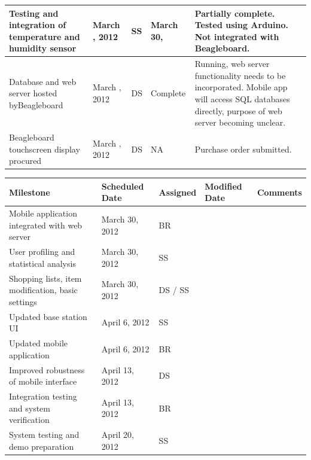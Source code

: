 \documentclass[11pt,letterpaper]{article}
\begin{document}
\begin{table}[h!]
\begin{center}
\begin{tabular}{| p{3.5 cm} | p{2 cm} | p{2 cm}| p{2 cm} | p{6 cm} | }
\hline
Testing and \newline integration of \newline temperature and \newline humidity sensor & March \newline 16,  2012 &SS & March 30, \newline 2012 & Partially complete. Tested using Arduino. Not integrated with \newline Beagleboard. \\
\hline
Database and web server hosted by\newline Beagleboard & March \newline 16, 2012 & DS & Complete & Running, web server functionality needs to be incorporated. Mobile app will access SQL databases directly, purpose of web server \newline becoming unclear.\\
\hline
Beagleboard \newline touchscreen display procured & March \newline 16, 2012 & DS & NA & Purchase order submitted. \\
\hline

\end{tabular}
\end{center}
\end{table}

\begin{table}[h!]
\begin{center}
\begin{tabular}{| p{3.5 cm} | p{2 cm} | p{2 cm}| p{2 cm} | p{6 cm} | }
\hline
\textbf{Milestone} & \textbf{Scheduled Date} & \textbf{Assigned} & \textbf{Modified Date} & \textbf{Comments} \\
\hline
Mobile application integrated with web server & March 30, 2012 &BR & & \\
\hline
User profiling and statistical analysis & March 30, 2012 & SS & & \\
\hline 
Shopping lists, item modification, basic \newline settings & March 30, 2012 & DS / SS & &\\
\hline
Updated base station UI & April 6, 2012 & SS & & \\
\hline
Updated mobile application & April 6, 2012 & BR & & \\
\hline
Improved robustness of mobile interface& April 13, 2012 & DS & & \\
\hline
Integration testing and system verification & April 13, 2012 & BR & & \\
\hline
System testing and demo preparation & April 20, 2012 & SS & & \\
\hline
\end{tabular}
\label {MilestoneTable}
\end{center}
\end{table}
\end{document}
